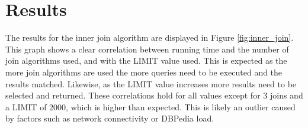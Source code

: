 \documentclass[10pt,a4paper]{article}
\begin{document}
	
	\section*{Results}
	
	The results for the inner join algorithm are displayed in Figure \ref{fig:inner_join}. This graph shows a clear correlation between running time and the number of join algorithms used, and with the LIMIT value used. This is expected as the more join algorithms are used the more queries need to be executed and the results matched. Likewise, as the LIMIT value increases more results need to be selected and returned. These correlations hold for all values except for 3 joins and a LIMIT of 2000, which is higher than expected. This is likely an outlier caused by factors such as network connectivity or DBPedia load.
	
\end{document}
